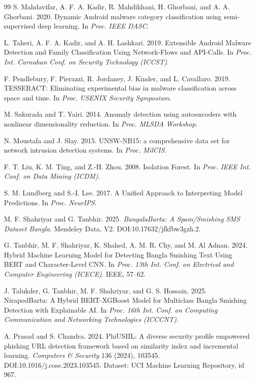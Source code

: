 \documentclass[manuscript,screen,review]{acmart}
\begin{document}
\begin{thebibliography}{99}
 S. Mahdavifar, A. F. A. Kadir, R. Mahdikhani, H. Ghorbani, and A. A. Ghorbani. 2020. Dynamic Android malware category classification using semi-supervised deep learning. In \emph{Proc. IEEE DASC}.

 L. Taheri, A. F. A. Kadir, and A. H. Lashkari. 2019. Extensible Android Malware Detection and Family Classification Using Network-Flows and API-Calls. In \emph{Proc. Int. Carnahan Conf. on Security Technology (ICCST)}.

 F. Pendlebury, F. Pierazzi, R. Jordaney, J. Kinder, and L. Cavallaro. 2019. TESSERACT: Eliminating experimental bias in malware classification across space and time. In \emph{Proc. USENIX Security Symposium}.

 M. Sakurada and T. Yairi. 2014. Anomaly detection using autoencoders with nonlinear dimensionality reduction. In \emph{Proc. MLSDA Workshop}.

 N. Moustafa and J. Slay. 2015. UNSW-NB15: a comprehensive data set for network intrusion detection systems. In \emph{Proc. MilCIS}.

 F. T. Liu, K. M. Ting, and Z.-H. Zhou. 2008. Isolation Forest. In \emph{Proc. IEEE Int. Conf. on Data Mining (ICDM)}.

 S. M. Lundberg and S.-I. Lee. 2017. A Unified Approach to Interpreting Model Predictions. In \emph{Proc. NeurIPS}.

 M. F. Shahriyar and G. Tanbhir. 2025. \emph{BangalaBarta: A Spam/Smishing SMS Dataset Bangla}. Mendeley Data, V2. DOI:10.17632/jfkfbw3gzh.2.

 G. Tanbhir, M. F. Shahriyar, K. Shahed, A. M. R. Chy, and M. Al Adnan. 2024. Hybrid Machine Learning Model for Detecting Bangla Smishing Text Using BERT and Character-Level CNN. In \emph{Proc. 13th Int. Conf. on Electrical and Computer Engineering (ICECE)}. IEEE, 57--62.

 J. Talukder, G. Tanbhir, M. F. Shahriyar, and G. S. Hossain. 2025. NirapodBarta: A Hybrid BERT-XGBoost Model for Multiclass Bangla Smishing Detection with Explainable AI. In \emph{Proc. 16th Int. Conf. on Computing Communication and Networking Technologies (ICCCNT)}.


 A. Prasad and S. Chandra. 2024. PhiUSIIL: A diverse security profile empowered phishing URL detection framework based on similarity index and incremental learning. \emph{Computers \& Security} 136 (2024), 103545. DOI:10.1016/j.cose.2023.103545. Dataset: UCI Machine Learning Repository, id 967.

\end{thebibliography}
\end{document}
